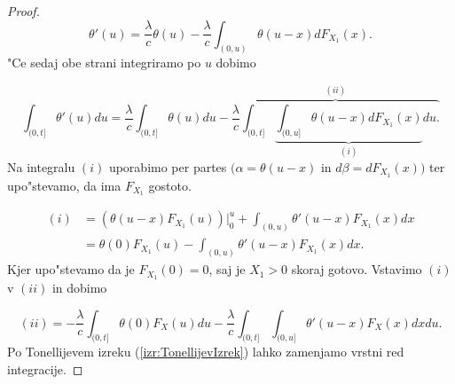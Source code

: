 \documentclass[12pt, a4paper, reqno]{amsart}
\theoremstyle{definition}
\theoremstyle{plain}
\newcommand{\1}{\mathds{1}}
\begin{document}
\begin{proof}
                \begin{equation*}
                    \theta'(u) = \frac{\lambda}{c}\theta(u) - \frac{\lambda}{c}\int_{(0, u)}\theta(u - x)dF_{X_1}(x).
                \end{equation*}
                "Ce sedaj obe strani integriramo po $u$ dobimo
                
                \begin{equation}
                    \int_{(0, t]}\theta'(u)du = \frac{\lambda}{c}\int_{(0, t]}\theta(u)du - \overbrace{\frac{\lambda}{c}\int_{(0, t]}\underbrace{\int_{(0, u]}\theta(u - x)dF_{X_1}(x)}_{(i)}du.}^{(ii)} 
                    \label{eq:verjetnostPrezivetjaIntegral}
                \end{equation}
                Na integralu $(i)$ uporabimo per partes $\bigl(\alpha = \theta(u-x)$ in $d\beta = dF_{X_1}(x)\bigr)$ 
                ter upo"stevamo, da ima $F_{X_1}$ gostoto.

                \begin{align*}
                    (i)     &= \left(\theta(u - x)F_{X_1}(u)\right)\Big|_{0}^{u} + \int_{(0, u)}\theta'(u - x)F_{X_1}(x)dx \\
                            &= \theta(0)F_{X_1}(u) - \int_{(0, u)}\theta'(u - x)F_{X_1}(x)dx.
                \end{align*}
                Kjer upo"stevamo da je $F_{X_1}(0) = 0$, saj je $X_1 > 0$ skoraj gotovo. Vstavimo $(i)$ 
                v $(ii)$ in dobimo

                \begin{equation*}
                    (ii) =  - \frac{\lambda}{c}\int_{(0, t]}\theta(0)F_X(u)du - \frac{\lambda}{c}\int_{(0, t]}\int_{(0, u]}\theta'(u - x)F_X(x)dxdu. 
                \end{equation*}
                Po Tonellijevem izreku (\ref{izr:TonellijevIzrek}) lahko zamenjamo vrstni red integracije.


\end{proof}
\end{document}
